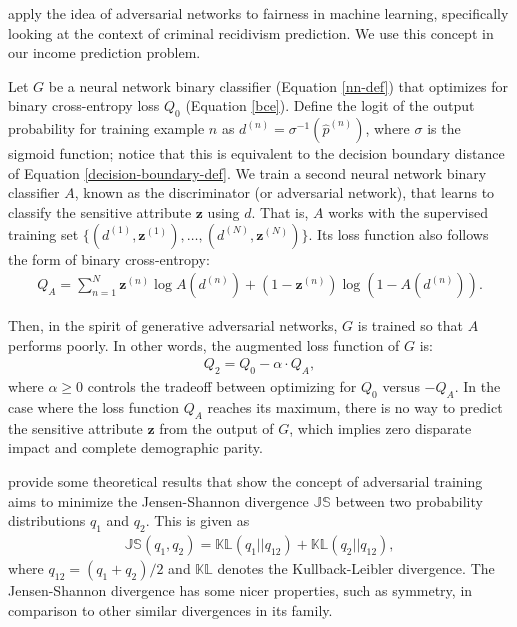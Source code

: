 \documentclass{article}
\newcommand{\bd}[1]{\boldsymbol{#1}}
\newcommand{\hp}{\hat{p}}
\newcommand{\idx}[3][]{{#2}^{(#3)}_{#1}}
\newcommand{\bidx}[3][]{\bd{#2}^{(#3)}_{#1}}
\begin{document}
\citet{wadsworth2018achieving} apply the idea of adversarial networks to fairness in machine learning, specifically looking at the context of criminal recidivism prediction.  We use this concept in our income prediction problem.  

Let $G$ be a neural network binary classifier (Equation \ref{nn-def}) that optimizes for binary cross-entropy loss $Q_0$ (Equation \ref{bce}).  Define the logit of the output probability for training example $n$ as $\idx d n = \sigma^{-1}(\idx \hp n)$, where $\sigma$ is the sigmoid function; notice that this is equivalent to the decision boundary distance of Equation \ref{decision-boundary-def}.  We train a second neural network binary classifier $A$, known as the discriminator (or adversarial network), that learns to classify the sensitive attribute $\bd z$ using $d$.  That is, $A$ works with the supervised training set $\{(\idx d 1, \bidx z 1), \ldots, (\idx d N, \bidx z N)\}$.  Its loss function also follows the form of binary cross-entropy:    
\begin{align}
Q_A = \sum_{n=1}^N \bidx z n \log A(\idx d n) + (1 - \bidx z n) \log (1 - A(\idx d n)). \label{bce}
\end{align}         

Then, in the spirit of generative adversarial networks, $G$ is trained so that $A$ performs poorly.  In other words, the augmented loss function of $G$ is:
\begin{align}
Q_2 = Q_0 - \alpha \cdot Q_A,
\end{align}
where $\alpha \geq 0$ controls the tradeoff between optimizing for $Q_0$ versus $-Q_A$.  In the case where the loss function $Q_A$ reaches its maximum, there is no way to predict the sensitive attribute $\bd z$ from the output of $G$, which implies zero disparate impact and complete demographic parity.   

\citet{goodfellow2014generative} provide some theoretical results that show the concept of adversarial training aims to minimize the Jensen-Shannon divergence $\mathbb{JS}$ between two probability distributions $q_1$ and $q_2$.  This is given as
\begin{align}
\mathbb{JS}(q_1, q_2) = \mathbb{KL}\left(q_1 || q_{12}\right) + \mathbb{KL}\left(q_2 || q_{12} \right),
\end{align}    
where $q_{12} = (q_1 + q_2) / 2$ and $\mathbb{KL}$ denotes the Kullback-Leibler divergence.  The Jensen-Shannon divergence has some nicer properties, such as symmetry, in comparison to other similar divergences in its family.  
\end{document}
